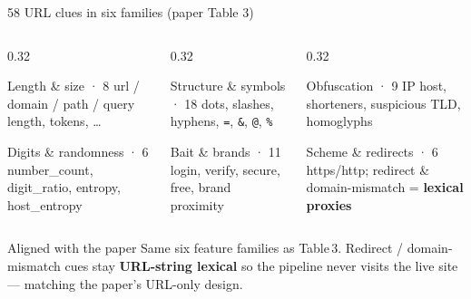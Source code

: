 \documentclass[aspectratio=169,11pt,xcolor=table]{beamer}
\begin{document}
\begin{frame}{58 URL clues in six families (paper Table 3)}
\begin{columns}[T,onlytextwidth]
\begin{column}{0.32\textwidth}
  \begin{block}{Length \& size · 8}
  \scriptsize url / domain / path / query length, tokens, \ldots
  \end{block}
  \vspace{0.25em}
  \begin{block}{Digits \& randomness · 6}
  \scriptsize number\_count, digit\_ratio, entropy, host\_entropy
  \end{block}
\end{column}
\begin{column}{0.32\textwidth}
  \begin{block}{Structure \& symbols · 18}
  \scriptsize dots, slashes, hyphens, \texttt{=}, \texttt{\&}, \texttt{@}, \texttt{\%}
  \end{block}
  \vspace{0.25em}
  \begin{alertblock}{Bait \& brands · 11}
  \scriptsize login, verify, secure, free, brand proximity
  \end{alertblock}
\end{column}
\begin{column}{0.32\textwidth}
  \begin{block}{Obfuscation · 9}
  \scriptsize IP host, shorteners, suspicious TLD, homoglyphs
  \end{block}
  \vspace{0.25em}
  \begin{exampleblock}{Scheme \& redirects · 6}
  \scriptsize https/http; redirect \& domain-mismatch = \textbf{lexical proxies}
  \end{exampleblock}
\end{column}
\end{columns}
\vspace{0.55em}
\begin{exampleblock}{Aligned with the paper}
\small Same six feature families as Table\,3. Redirect / domain-mismatch cues stay
\textbf{URL-string lexical} so the pipeline never visits the live site --- matching the paper's URL-only design.
\end{exampleblock}
\end{frame}
\end{document}
